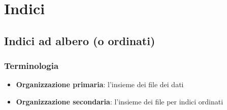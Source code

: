 \documentclass[12pt, a4paper]{report}
\begin{document}
    \section{Indici}
    \subsection{Indici ad albero (o ordinati)}
    \subsubsection{Terminologia}
    \begin{itemize}
        \item \textbf{Organizzazione primaria}: l'insieme dei file dei dati
        \item \textbf{Organizzazione secondaria}: l'insieme dei file per indici ordinati
    \end{itemize}
\end{document}
